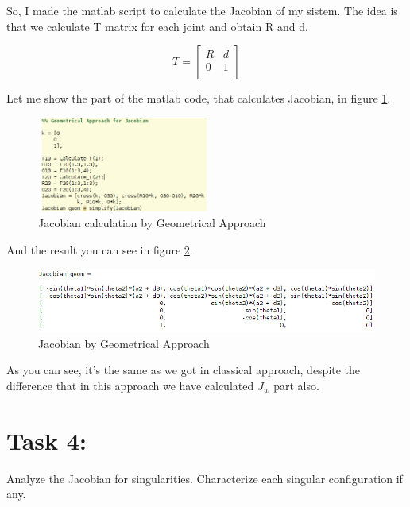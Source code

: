 \documentclass[12pt, a4paper]{report}
\begin{document}
So, I made the matlab script to calculate the Jacobian of my sistem. The idea is that we calculate T matrix for each joint and obtain R and d. 

\begin{equation}
        T =
        \begin{bmatrix}
                R & d\\
               0 &1\\
        \end{bmatrix}    
\end{equation}

Let me show the part of the matlab code, that calculates Jacobian, in figure \ref{fig:mesh6}.

\begin{figure}[H]
	\centering
		\includegraphics[width=0.5\textwidth]{Image6} %
	\caption{Jacobian calculation by Geometrical Approach} %
	\label{fig:mesh6}
\end{figure}

And the result you can see in figure \ref{fig:mesh7}.

\begin{figure}[H]
	\centering
		\includegraphics[width=1.0\textwidth]{Image7} %
	\caption{Jacobian by Geometrical Approach} %
	\label{fig:mesh7}
\end{figure}

As you can see, it's the same as we got in classical approach, despite the difference that in this approach we have calculated $J_w$ part also.



\section*{Task 4:}
Analyze the Jacobian for singularities. Characterize each singular configuration if any.
\end{document}

